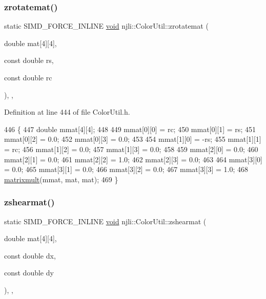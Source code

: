 \subsubsection{\texorpdfstring{zrotatemat()}{zrotatemat()}}
{\footnotesize\ttfamily static S\+I\+M\+D\+\_\+\+F\+O\+R\+C\+E\+\_\+\+I\+N\+L\+I\+NE \mbox{\hyperlink{_thread_8h_af1e856da2e658414cb2456cb6f7ebc66}{void}} njli\+::\+Color\+Util\+::zrotatemat (\begin{DoxyParamCaption}\item[{double}]{mat\mbox{[}4\mbox{]}\mbox{[}4\mbox{]},  }\item[{const double}]{rs,  }\item[{const double}]{rc }\end{DoxyParamCaption})\hspace{0.3cm}{\ttfamily [inline]}, {\ttfamily [static]}, {\ttfamily [protected]}}



Definition at line 444 of file Color\+Util.\+h.


\begin{DoxyCode}
446     \{
447       \textcolor{keywordtype}{double} mmat[4][4];
448 
449       mmat[0][0] = rc;
450       mmat[0][1] = rs;
451       mmat[0][2] = 0.0;
452       mmat[0][3] = 0.0;
453 
454       mmat[1][0] = -rs;
455       mmat[1][1] = rc;
456       mmat[1][2] = 0.0;
457       mmat[1][3] = 0.0;
458 
459       mmat[2][0] = 0.0;
460       mmat[2][1] = 0.0;
461       mmat[2][2] = 1.0;
462       mmat[2][3] = 0.0;
463 
464       mmat[3][0] = 0.0;
465       mmat[3][1] = 0.0;
466       mmat[3][2] = 0.0;
467       mmat[3][3] = 1.0;
468       \mbox{\hyperlink{classnjli_1_1_color_util_a5cb3576c8177f303c88dc4e7283367c7}{matrixmult}}(mmat, mat, mat);
469     \}
\end{DoxyCode}
\mbox{\label{classnjli_1_1_color_util_a97183f17df4c96e96351e96c94fc587a}} 
\subsubsection{\texorpdfstring{zshearmat()}{zshearmat()}}
{\footnotesize\ttfamily static S\+I\+M\+D\+\_\+\+F\+O\+R\+C\+E\+\_\+\+I\+N\+L\+I\+NE \mbox{\hyperlink{_thread_8h_af1e856da2e658414cb2456cb6f7ebc66}{void}} njli\+::\+Color\+Util\+::zshearmat (\begin{DoxyParamCaption}\item[{double}]{mat\mbox{[}4\mbox{]}\mbox{[}4\mbox{]},  }\item[{const double}]{dx,  }\item[{const double}]{dy }\end{DoxyParamCaption})\hspace{0.3cm}{\ttfamily [inline]}, {\ttfamily [static]}, {\ttfamily [protected]}}



